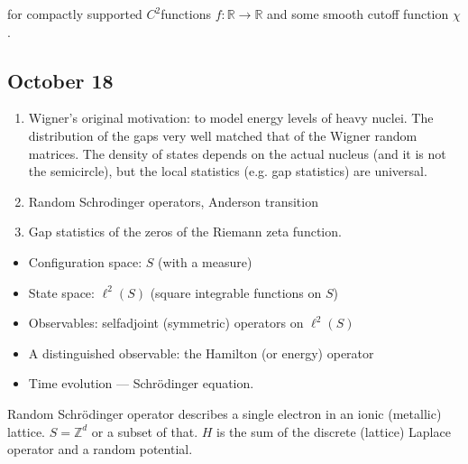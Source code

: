 \documentclass[letterpaper,10pt,english]{sphinxhowto}
\begin{document}
\sphinxAtStartPar
for compactly supported \(C^2\)\sphinxhyphen{}functions \(f\colon\mathbb R\to\mathbb R\) and some smooth cut\sphinxhyphen{}off function \(\chi\).


\subsection{October 18}
\label{\detokenize{teaching/random_matrices_2017:october-18}}
\sphinxAtStartPar
{}
\begin{enumerate}
%
\item {} 
\sphinxAtStartPar
Wigner’s original motivation: to model energy levels of heavy nuclei. The distribution of the gaps very well matched that of the Wigner random matrices. The density of states depends on the actual nucleus (and it is not the semicircle), but the local statistics (e.g. gap statistics) are universal.

\item {} 
\sphinxAtStartPar
Random Schrodinger operators, Anderson transition

\item {} 
\sphinxAtStartPar
Gap statistics of the zeros of the Riemann zeta function.

\end{enumerate}

\sphinxAtStartPar
{}
\begin{itemize}
\item {} 
\sphinxAtStartPar
Configuration space: \(S\) (with a measure)

\item {} 
\sphinxAtStartPar
State space: \(\ell^2(S)\) (square integrable functions on \(S\))

\item {} 
\sphinxAtStartPar
Observables: self\sphinxhyphen{}adjoint (symmetric) operators on \(\ell^2(S)\)

\item {} 
\sphinxAtStartPar
A distinguished observable: the Hamilton (or energy) operator

\item {} 
\sphinxAtStartPar
Time evolution — Schrödinger equation.

\end{itemize}

\sphinxAtStartPar
Random Schrödinger operator describes a single electron in an ionic (metallic) lattice. \(S = \mathbb Z^d\) or a subset of that. \(H\) is the sum of the discrete (lattice) Laplace operator and a random potential.
\end{document}

